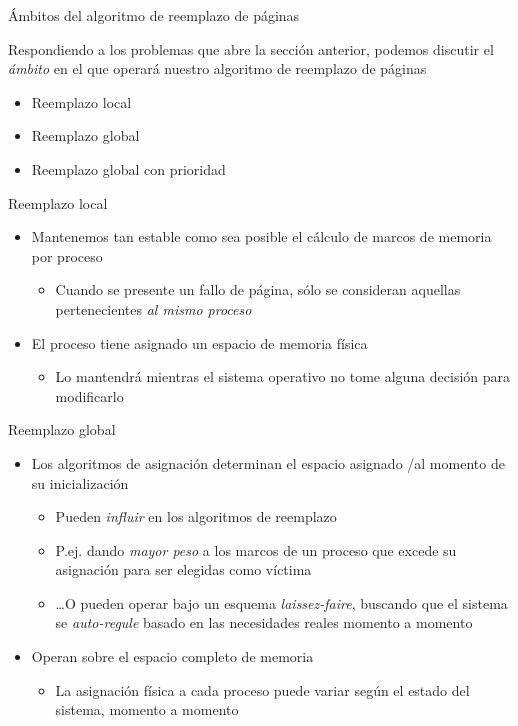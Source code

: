 \documentclass[presentation]{beamer}
\begin{document}
\begin{frame}[label={sec:orgff784d5}]{Ámbitos del algoritmo de reemplazo de páginas}
\begin{center}
Respondiendo a los problemas que abre la sección anterior, podemos
discutir el \emph{ámbito} en el que operará nuestro algoritmo de reemplazo
de páginas
\end{center}

\begin{itemize}
\item Reemplazo local
\item Reemplazo global
\item Reemplazo global con prioridad
\end{itemize}
\end{frame}

\begin{frame}[label={sec:org5f81321}]{Reemplazo local}
\begin{itemize}
\item Mantenemos tan estable como sea posible el cálculo de marcos de
memoria por proceso
\begin{itemize}
\item Cuando se presente un fallo de página, sólo se consideran
aquellas pertenecientes \emph{al mismo proceso}
\end{itemize}
\item El proceso tiene asignado un espacio de memoria física
\begin{itemize}
\item Lo mantendrá mientras el sistema operativo no tome alguna decisión
para modificarlo
\end{itemize}
\end{itemize}
\end{frame}

\begin{frame}[label={sec:orgf559cb5}]{Reemplazo global}
\begin{itemize}
\item Los algoritmos de asignación determinan el espacio asignado /al
momento de su inicialización
\begin{itemize}
\item Pueden \emph{influir} en los algoritmos de reemplazo
\item P.ej. dando \emph{mayor peso} a los marcos de un proceso que excede su
asignación para ser elegidas como víctima
\item \ldots{}O pueden operar bajo un esquema \emph{laissez-faire}, buscando que
el sistema se \emph{auto-regule} basado en las necesidades reales
momento a momento
\end{itemize}
\item Operan sobre el espacio completo de memoria
\begin{itemize}
\item La asignación física a cada proceso puede variar según el estado
del sistema, momento a momento
\end{itemize}
\end{itemize}
\end{frame}
\end{document}
